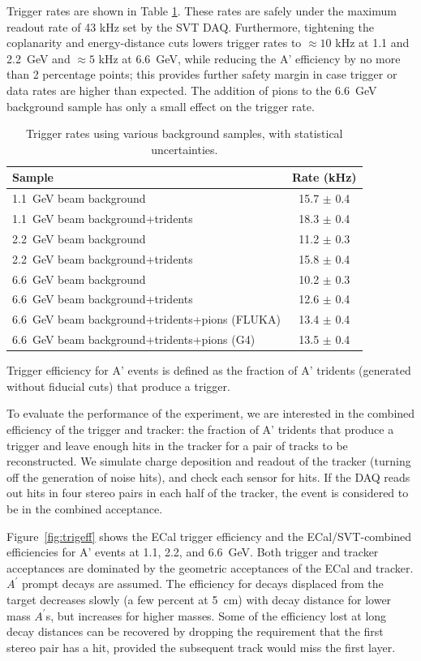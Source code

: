 Trigger rates are shown in Table \ref{tab:trigrates}. These rates are safely under the maximum readout rate of 43 kHz set by the SVT DAQ. 
Furthermore, tightening the coplanarity and energy-distance cuts lowers trigger rates to $\approx 10$ kHz at 1.1 and 2.2~GeV and $\approx 5$ kHz at 6.6~GeV, while reducing the A' efficiency by no more than 2 percentage points; this provides further safety margin in case trigger or data rates are higher than expected.
The addition of pions to the 6.6~GeV background sample has only a small effect on the trigger rate.

\begin{table}
	\begin{tabular}{|l|c|}
		\hline
		Sample &  Rate (kHz)\\
		\hline
		1.1~GeV	beam background 				& 15.7 $\pm$ 0.4	\\
		1.1~GeV beam background+tridents			& 18.3 $\pm$ 0.4	\\
		2.2~GeV	beam background 				& 11.2 $\pm$ 0.3	\\
		2.2~GeV beam background+tridents			& 15.8 $\pm$ 0.4	\\
		6.6~GeV	beam background 				& 10.2 $\pm$ 0.3	\\
		6.6~GeV beam background+tridents			& 12.6 $\pm$ 0.4	\\
		6.6~GeV beam background+tridents+pions (FLUKA)	& 13.4 $\pm$ 0.4	\\
		6.6~GeV beam background+tridents+pions (G4)	& 13.5 $\pm$ 0.4	\\
		\hline
	\end{tabular}
	\caption{ {\small Trigger rates using various background samples, with statistical uncertainties. }
	\label{tab:trigrates}}
\end{table}

Trigger efficiency for A' events is defined as the fraction of A' tridents (generated without fiducial cuts) that produce a trigger.

To evaluate the performance of the experiment, we are interested in the combined efficiency of the trigger and tracker: the fraction of A' tridents that produce a trigger and leave enough hits in the tracker for a pair of tracks to be reconstructed.
We simulate charge deposition and readout of the tracker (turning off the generation of noise hits), and check each sensor for hits. 
If the DAQ reads out hits in four stereo pairs in each half of the tracker, the event is considered to be in the combined acceptance.


Figure~\ref{fig:trigeff} shows the ECal trigger efficiency and the ECal/SVT-combined efficiencies for A' events at 1.1, 2.2, and 6.6~GeV. 
Both trigger and tracker acceptances are dominated by the geometric acceptances of the ECal and tracker.
$A^\prime$ prompt decays are assumed.  The efficiency for decays displaced from the target decreases slowly (a few percent at 5~cm) 
with decay distance for lower mass $A^\prime$s, but increases for higher masses.  Some of the efficiency lost at long decay distances 
can be recovered by dropping the requirement that the first stereo pair has a hit, provided the subsequent track would miss the first layer.  


